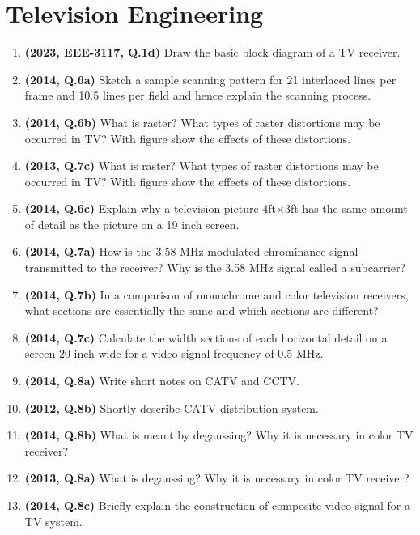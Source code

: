 \documentclass[12pt, a4paper]{article}
\begin{document}
	\section{Television Engineering}
	\begin{enumerate}
		\item \textbf{(2023, EEE-3117, Q.1d)} Draw the basic block diagram of a TV receiver.
		\item \textbf{(2014, Q.6a)} Sketch a sample scanning pattern for 21 interlaced lines per frame and 10.5 lines per field and hence explain the scanning process.
		
		\item \textbf{(2014, Q.6b)} What is raster? What types of raster distortions may be occurred in TV? With figure show the effects of these distortions.
		\item \textbf{(2013, Q.7c)} What is raster? What types of raster distortions may be occurred in TV? With figure show the effects of these distortions.
		
		\item \textbf{(2014, Q.6c)} Explain why a television picture 4ft$\times$3ft has the same amount of detail as the picture on a 19 inch screen.
		
		\item \textbf{(2014, Q.7a)} How is the 3.58 MHz modulated chrominance signal transmitted to the receiver? Why is the 3.58 MHz signal called a subcarrier?
		
		\item \textbf{(2014, Q.7b)} In a comparison of monochrome and color television receivers, what sections are essentially the same and which sections are different?
		
		\item \textbf{(2014, Q.7c)} Calculate the width sections of each horizontal detail on a screen 20 inch wide for a video signal frequency of 0.5 MHz.
		
		\item \textbf{(2014, Q.8a)} Write short notes on CATV and CCTV.
		\item \textbf{(2012, Q.8b)} Shortly describe CATV distribution system.
		
		\item \textbf{(2014, Q.8b)} What is meant by degaussing? Why it is necessary in color TV receiver?
		\item \textbf{(2013, Q.8a)} What is degaussing? Why it is necessary in color TV receiver?
		
		\item \textbf{(2014, Q.8c)} Briefly explain the construction of composite video signal for a TV system.
		

\end{enumerate}
\end{document}
